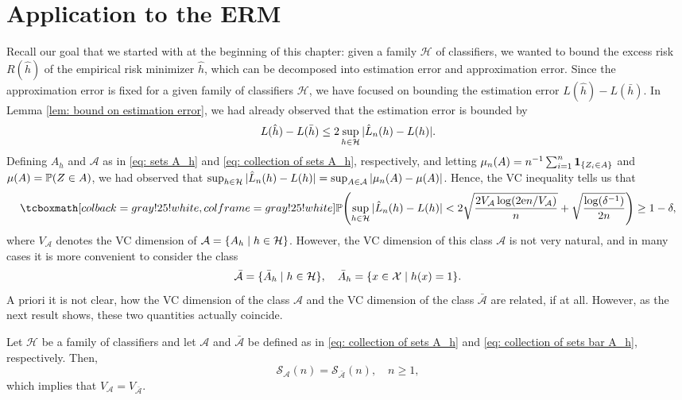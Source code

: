 \section{Application to the ERM}

Recall our goal that we started with at the beginning of this chapter: given a family $\mathcal{H}$ of classifiers, we wanted to bound the excess risk $R(\hat{h})$ of the empirical risk minimizer $\hat{h}$, which can be decomposed into estimation error and approximation error. Since the approximation error is fixed for a given family of classifiers $\mathcal{H}$, we have focused on bounding the estimation error $L(\hat{h}) - L(\bar{h})$. In Lemma \ref{lem: bound on estimation error}, we had already observed that the estimation error is bounded by
\[
    L(\hat{h}) - L(\bar{h}) \leq 2 \sup_{h \in \mathcal{H}} \abs*{\hat{L}_n(h) - L(h)}.
\]
Defining $A_h$ and $\mathcal{A}$ as in \eqref{eq: sets A_h} and \eqref{eq: collection of sets A_h}, respectively, and letting $\mu_n(A) = n^{-1} \sum_{i=1}^n \indSet{Z_i \in A}$ and $\mu(A) = \P(Z \in A)$, we had observed that $\sup_{h \in \mathcal{H}} \abs*{\hat{L}_n(h) - L(h)} = \sup_{A \in \mathcal{A}} \abs{\mu_n(A) - \mu(A)}$. Hence, the VC inequality tells us that
\begin{equation}
\label{eq: VC ineqaulity for ERM}
    \highlightMath{
        \P\left(\sup_{h \in \mathcal{H}} \abs*{\hat{L}_n(h) - L(h)} < 2 \sqrt{\frac{2 V_{\mathcal{A}} \log(2 \e n / V_{\mathcal{A}})}{n}} + \sqrt{\frac{\log(\delta^{-1})}{2n}}\right) \geq 1 - \delta,
    }
\end{equation}
where $V_{\mathcal{A}}$ denotes the VC dimension of $\mathcal{A} = \set{A_h \with h \in \mathcal{H}}$. However, the VC dimension of this class $\mathcal{A}$ is not very natural, and in many cases it is more convenient to consider the class
\begin{equation}
\label{eq: collection of sets bar A_h}
    \bar{\mathcal{A}} = \{\bar A_h \with h \in \mathcal{H}\}, \quad \bar A_h = \set{x \in \mathcal{X} \with h(x) = 1}.
\end{equation}
A priori it is not clear, how the VC dimension of the class $\mathcal{A}$ and the VC dimension of the class $\bar{\mathcal{A}}$ are related, if at all. However, as the next result shows, these two quantities actually coincide.

\begin{theorem}
Let $\mathcal{H}$ be a family of classifiers and let $\mathcal{A}$ and $\bar{\mathcal{A}}$ be defined as in \eqref{eq: collection of sets A_h} and \eqref{eq: collection of sets bar A_h}, respectively. Then,
\[
    \mathcal{S}_{\mathcal{A}}(n) = \mathcal{S}_{\bar{\mathcal{A}}}(n), \quad n \geq 1,
\]
which implies that $V_{\mathcal{A}} = V_{\bar{\mathcal{A}}}$.
\end{theorem}

